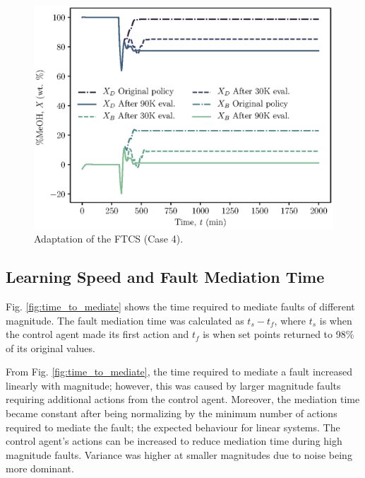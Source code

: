 \begin{figure}[H]
    \begin{center}
        \includegraphics{images/ftc/Case4_Plot.eps}
        \caption{\label{fig:case_study4} Adaptation of the FTCS (Case 4).}
    \end{center}
\end{figure}

\subsection{Learning Speed and Fault Mediation Time}
Fig. \ref{fig:time_to_mediate} shows the time required to mediate faults of different magnitude. The fault mediation time was calculated as $t_{s} - t_{f}$, where $t_{s}$ is when the control agent made its first action and $t_f$ is when set points returned to 98\% of its original values.

From Fig. \ref{fig:time_to_mediate}, the time required to mediate a fault increased linearly with magnitude; however, this was caused by larger magnitude faults requiring additional actions from the control agent.  Moreover, the mediation time became constant after being normalizing by the minimum number of actions required to mediate the fault; the expected behaviour for linear systems. The control agent's actions can be increased to reduce mediation time during high magnitude faults.  Variance was higher at smaller magnitudes due to noise being more dominant.

